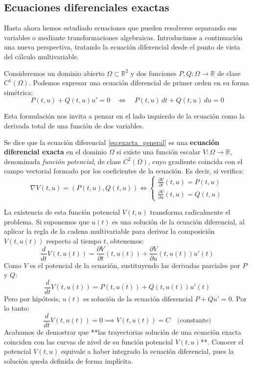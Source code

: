 \subsection{Ecuaciones diferenciales exactas}

Hasta ahora hemos estudiado ecuaciones que pueden resolverse separando sus variables o mediante transformaciones algebraicas. Introducimos a continuación una nueva perspectiva, tratando la ecuación diferencial desde el punto de vista del cálculo multivariable.

Consideremos un dominio abierto $\Omega \subset \mathbb{R}^2$ y dos funciones $P, Q : \Omega \to \mathbb{R}$ de clase $C^1(\Omega)$. Podemos expresar una ecuación diferencial de primer orden en su forma simétrica:
\begin{equation} \label{eq:exacta_general}
    P(t,u) + Q(t,u) u' = 0 \quad \iff \quad P(t,u) \, dt + Q(t,u) \, du = 0
\end{equation}

Esta formulación nos invita a pensar en el lado izquierdo de la ecuación como la derivada total de una función de dos variables.

\begin{definición}
    Se dice que la ecuación diferencial \eqref{eq:exacta_general} es una \textbf{ecuación diferencial exacta} en el dominio $\Omega$ si existe una función escalar $V : \Omega \to \mathbb{R}$, denominada \textit{función potencial}, de clase $C^2(\Omega)$, cuyo gradiente coincida con el campo vectorial formado por los coeficientes de la ecuación. Es decir, si verifica:
    \[
        \nabla V(t,u) = (P(t,u), Q(t,u)) \iff
        \begin{cases}
            \frac{\partial V}{\partial t} (t,u) = P(t,u) \\
            \frac{\partial V}{\partial u} (t,u) = Q(t,u)
        \end{cases}
    \] 
\end{definición}

La existencia de esta función potencial $V(t,u)$ transforma radicalmente el problema. Si suponemos que $u(t)$ es una solución de la ecuación diferencial, al aplicar la regla de la cadena multivariable para derivar la composición $V(t, u(t))$ respecto al tiempo $t$, obtenemos:
\[
    \frac{d}{dt} V(t, u(t)) = \frac{\partial V}{\partial t}(t,u(t)) + \frac{\partial V}{\partial u}(t,u(t)) u'(t)
\]
Como $V$ es el potencial de la ecuación, sustituyendo las derivadas parciales por $P$ y $Q$:
\[
    \frac{d}{dt} V(t, u(t)) = P(t,u(t)) + Q(t,u(t)) u'(t)
\]
Pero por hipótesis, $u(t)$ es solución de la ecuación diferencial $P + Qu' = 0$. Por lo tanto:
\[
    \frac{d}{dt} V(t, u(t)) = 0 \implies V(t, u(t)) = C \quad \text{(constante)}
\]
Acabamos de demostrar que **las trayectorias solución de una ecuación exacta coinciden con las curvas de nivel de su función potencial $V(t,u)$**. Conocer el potencial $V(t,u)$ equivale a haber integrado la ecuación diferencial, pues la solución queda definida de forma implícita.


